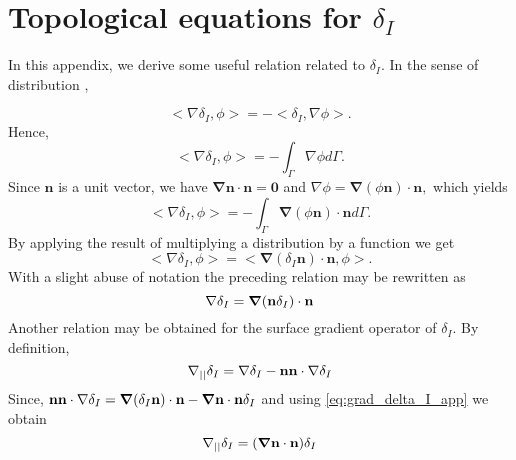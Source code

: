 \section{Topological equations for $\delta_I$}
\label{ap:delta_I}
In this appendix, we derive some useful relation related to $\delta_I$. In the sense of distribution \citep{appel2007}, 

\begin{equation}
<\nabla \delta_I,\phi> = - <\delta_I,\nabla \phi>.
\end{equation}
Hence,
\begin{equation}
<\nabla \delta_I,\phi> = - \int_{\Gamma} \nabla \phi d\Gamma.
\label{eq:1grad_delta_I}
\end{equation}
Since $\textbf{n}$ is a unit vector, we have $\bm\nabla \textbf{n} \cdot \textbf{n} =\bm 0$ and%
$\nabla \phi= \bm\nabla (\phi \textbf{n}) \cdot \textbf{n},$
which yields 
\begin{equation}
<\nabla \delta_I,\phi> = - \int_{\Gamma} \bm\nabla (\phi \textbf{n}) \cdot \textbf{n} d\Gamma. 
\end{equation}
By applying the result of multiplying a distribution by a function we get \citep{appel2007} %
\begin{equation}
<\nabla \delta_I,\phi> = <\bm\nabla (\delta _I \textbf{n}) \cdot \textbf{n},\phi>.
\end{equation}
With a slight abuse of notation the preceding relation may be rewritten as
\begin{equation}
    \mathbf{\nabla}\delta_I 
    =   \bm\nabla (\textbf{n} \delta_I) \cdot \textbf{n}
    \label{eq:grad_delta_I_app}
\end{equation}
Another relation may be obtained for the surface gradient operator of $\delta_I$. By definition,
\begin{equation}
  \mathbf{\nabla}_{||} \delta_I  = \mathbf{\nabla}\delta_I - \textbf{nn}\cdot\mathbf{\nabla}\delta_I
\end{equation}
Since, $\textbf{nn}\cdot\mathbf{\nabla}\delta_I = \bm{\mathbf{\nabla}} (\delta_I\textbf{n})\cdot \textbf{n}-\bm{\mathbf{\nabla}}\textbf{n}\cdot \textbf{n} \delta_I$ and using \ref{eq:grad_delta_I_app} we obtain
\begin{equation}
  \mathbf{\nabla}_{||} \delta_I  = (\bm{\mathbf{\nabla}}\textbf{n}\cdot \textbf{n}) \delta_I
\label{eq:gradI_deltaI}
\end{equation}


